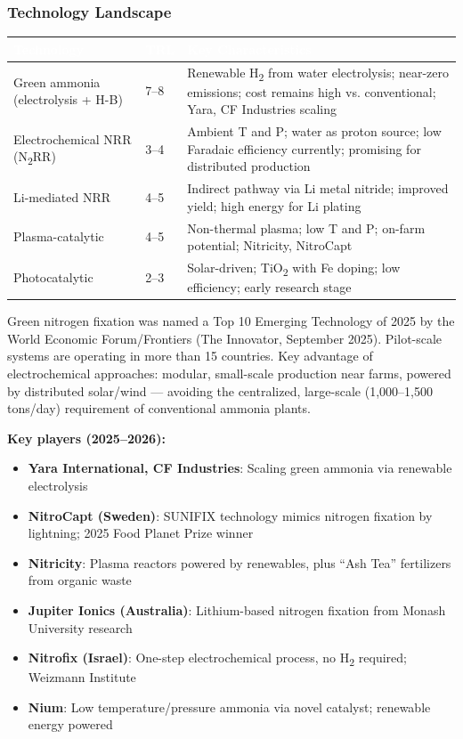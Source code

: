 \documentclass[11pt,letterpaper]{article}
\newcommand{\tableheader}[1]{\textbf{\sffamily\textcolor{white}{#1}}}
\begin{document}
\subsubsection{Technology Landscape}

\begin{center}
\begin{tabularx}{\textwidth}{L{3cm}L{2.5cm}X}
\toprule
{}
\tableheader{Technology} & \tableheader{TRL} & \tableheader{Key Characteristics} \\
\midrule
Green ammonia (electrolysis + H-B) & 7--8 & Renewable H\textsubscript{2} from water electrolysis; near-zero emissions; cost remains high vs. conventional; Yara, CF Industries scaling \\
Electrochemical NRR (N\textsubscript{2}RR) & 3--4 & Ambient T and P; water as proton source; low Faradaic efficiency currently; promising for distributed production \\
Li-mediated NRR & 4--5 & Indirect pathway via Li metal nitride; improved yield; high energy for Li plating \\
Plasma-catalytic & 4--5 & Non-thermal plasma; low T and P; on-farm potential; Nitricity, NitroCapt \\
Photocatalytic & 2--3 & Solar-driven; TiO\textsubscript{2} with Fe doping; low efficiency; early research stage \\
\bottomrule
\end{tabularx}
\end{center}

Green nitrogen fixation was named a Top 10 Emerging Technology of 2025 by the World Economic Forum/Frontiers (The Innovator, September 2025). Pilot-scale systems are operating in more than 15 countries. Key advantage of electrochemical approaches: modular, small-scale production near farms, powered by distributed solar/wind --- avoiding the centralized, large-scale (1,000--1,500 tons/day) requirement of conventional ammonia plants.

\textbf{Key players (2025--2026):}
\begin{itemize}[leftmargin=1.5em]
  \item \textbf{Yara International, CF Industries}: Scaling green ammonia via renewable electrolysis
  \item \textbf{NitroCapt (Sweden)}: SUNIFIX technology mimics nitrogen fixation by lightning; 2025 Food Planet Prize winner
  \item \textbf{Nitricity}: Plasma reactors powered by renewables, plus ``Ash Tea'' fertilizers from organic waste
  \item \textbf{Jupiter Ionics (Australia)}: Lithium-based nitrogen fixation from Monash University research
  \item \textbf{Nitrofix (Israel)}: One-step electrochemical process, no H\textsubscript{2} required; Weizmann Institute
  \item \textbf{Nium}: Low temperature/pressure ammonia via novel catalyst; renewable energy powered
\end{itemize}
\end{document}
